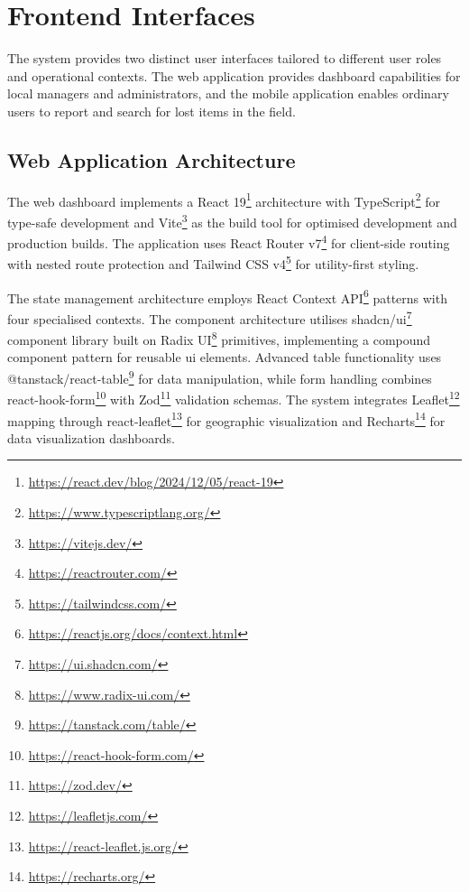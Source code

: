

\section{Frontend Interfaces} \label{section:frontend_interfaces}

The system provides two distinct user interfaces tailored to different user roles and operational contexts. The web application provides dashboard capabilities for local managers and administrators, and the mobile application enables ordinary users to report and search for lost items in the field.

\subsection{Web Application Architecture} \label{subsection:web_application}

The web dashboard implements a React 19\footnote{\url{https://react.dev/blog/2024/12/05/react-19}} architecture with TypeScript\footnote{\url{https://www.typescriptlang.org/}} for type-safe development and Vite\footnote{\url{https://vitejs.dev/}} as the build tool for optimised development and production builds. The application uses React Router v7\footnote{\url{https://reactrouter.com/}} for client-side routing with nested route protection and Tailwind CSS v4\footnote{\url{https://tailwindcss.com/}} for utility-first styling.

The state management architecture employs React Context API\footnote{\url{https://reactjs.org/docs/context.html}} patterns with four specialised contexts. The component architecture utilises shadcn/ui\footnote{\url{https://ui.shadcn.com/}} component library built on Radix UI\footnote{\url{https://www.radix-ui.com/}} primitives, implementing a compound component pattern for reusable \ac{ui} elements. Advanced table functionality uses @tanstack/react-table\footnote{\url{https://tanstack.com/table/}} for data manipulation, while form handling combines react-hook-form\footnote{\url{https://react-hook-form.com/}} with Zod\footnote{\url{https://zod.dev/}} validation schemas. The system integrates Leaflet\footnote{\url{https://leafletjs.com/}} mapping through react-leaflet\footnote{\url{https://react-leaflet.js.org/}} for geographic visualization and Recharts\footnote{\url{https://recharts.org/}} for data visualization dashboards.

